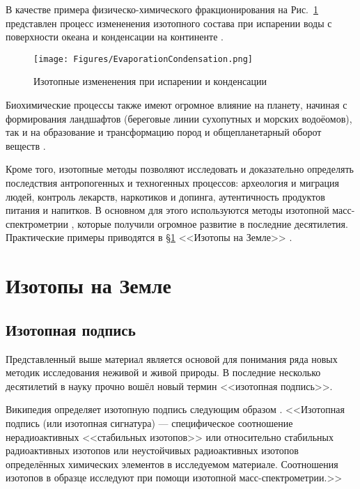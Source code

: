 \documentclass[a5paper,openany]{book}
\begin{document}
В качестве примера физическо-химического фракционирования на Рис.~\ref{f:EvaporationCondensation} представлен процесс измененения изотопного состава при испарении воды с поверхности океана и конденсации на континенте \cite{StableIsotopeDeltas}.
\begin{figure}[ht] 
	\centering\small
	\unitlength=1mm
	\texttt{[image: Figures/EvaporationCondensation.png]} 
	\caption{Изотопные измененения при испарении и конденсации \cite{StableIsotopeDeltas} }
	\label{f:EvaporationCondensation}
\end{figure}

Биохимические процессы также имеют огромное влияние на планету, начиная с формирования ландшафтов (береговые линии сухопутных и морских водоёомов), так и на образование и трансформацию пород и общепланетарный оборот веществ \cite{Zhuravlev2019}.  

Кроме того, изотопные методы позволяют исследовать и доказательно определять последствия антропогенных и техногенных процессов: археология и миграция людей, контроль лекарств, наркотиков и допинга, аутентичность продуктов питания и напитков. В основном для этого используются методы изотопной масс-спектрометрии \cite{ MS2013, Lebedev2003}, которые получили огромное развитие в последние десятилетия.
Практические примеры приводятся в  \S\ref{s:IsotopesEarth} <<Изотопы на Земле>> .


\section{Изотопы на Земле}\label{s:IsotopesEarth}


\subsection{Изотопная подпись}\label{s:IsotopeSignature}

Представленный выше материал является основой для понимания ряда новых методик исследования неживой и живой природы. 
В последние несколько десятилетий в науку прочно вошёл новый термин <<изотопная подпись>>. 

Википедия определяет изотопную подпись следующим образом \cite{IsotopeSignatureWiki}. 
<<Изотопная подпись  (или изотопная сигнатура) --- специфическое соотношение нерадиоактивных <<стабильных изотопов>> или относительно стабильных радиоактивных изотопов или неустойчивых радиоактивных изотопов определённых химических элементов в исследуемом материале. Соотношения изотопов в образце исследуют при помощи изотопной масс-спектрометрии.>>
\end{document}
